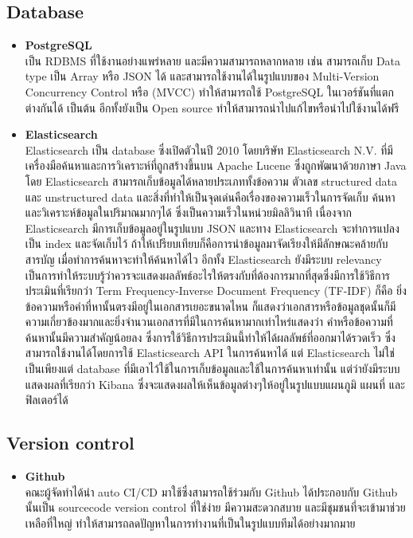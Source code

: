 \documentclass[12pt,oneside,openright,a4paper]{cpe-thai-project}
\begin{document}
\subsection{Database}
\begin{itemize}
  \item \textbf{PostgreSQL} \\
\hspace*{1cm} เป็น RDBMS ที่ใช้งานอย่างแพร่หลาย และมีความสามารถหลากหลาย เช่น สามารถเก็บ Data type เป็น Array หรือ JSON ได้ และสามารถใช้งานได้ในรูปแบบของ Multi-Version Concurrency Control หรือ (MVCC) ทำให้สามารถใช้ PostgreSQL ในเวอร์ชันที่แตกต่างกันได้ เป็นต้น อีกทั้งยังเป็น Open source ทำให้สามารถนำไปแก้ไขหรือนำไปใช้งานได้ฟรี
  \item \textbf{Elasticsearch} \\
\hspace*{1cm} Elasticsearch \cite{WhatIsElasticsearch, ElasticsearchForSearchEngine} เป็น database ซึ่งเปิดตัวในปี 2010 โดยบริษัท Elasticsearch N.V. ที่มีเครื่องมือค้นหาและการวิเคราะห์ที่ถูกสร้างขึ้นบน Apache Lucene ซึ่งถูกพัฒนาด้วยภาษา Java โดย Elasticsearch สามารถเก็บข้อมูลได้หลายประเภททั้งข้อความ ตัวเลข structured data และ unstructured data และสิ่งที่ทำให้เป็นจุดเด่นคือเรื่องของความเร็วในการจัดเก็บ ค้นหา และวิเคราะห์ข้อมูลในปริมาณมากๆได้ ซึ่งเป็นความเร็วในหน่วยมิลลิวินาที เนื่องจาก Elasticsearch มีการเก็บข้อมูลอยู่ในรูปแบบ JSON และทาง Elasticsearch จะทำการแปลงเป็น index และจัดเก็บไว้ ถ้าให้เปรียบเทียบก็คือการนำข้อมูลมาจัดเรียงให้มีลักษณะคล้ายกับสารบัญ เมื่อทำการค้นหาจะทำให้ค้นหาได้ไว อีกทั้ง Elasticsearch ยังมีระบบ relevancy เป็นการทำให้ระบบรู้ว่าควรจะแสดงผลลัพธ์อะไรให้ตรงกับที่ต้องการมากที่สุดซึ่งมีการใช้วิธีการประเมินที่เรียกว่า Term Frequency-Inverse Document Frequency (TF-IDF) ก็คือ ยิ่งข้อความหรือคำที่หานั้นตรงมีอยู่ในเอกสารเยอะขนาดไหน ก็แสดงว่าเอกสารหรือข้อมูลชุดนั้นก็มีความเกี่ยวข้องมากและยิ่งจำนวนเอกสารที่มีในการค้นหามากเท่าไหร่แสดงว่า คำหรือข้อความที่ค้นหานั้นมีความสำคัญน้อยลง ซึ่งการใช้วิธีการประเมินนี้ทำให้ได้ผลลัพธ์ที่ออกมาได้รวดเร็ว ซึ่งสามารถใช้งานได้โดยการใช้ Elasticsearch API ในการค้นหาได้ แต่ Elasticsearch ไม่ใช่เป็นเพียงแต่ database ที่มีเอาไว้ใช้ในการเก็บข้อมูลและใช้ในการค้นหาเท่านั้น แต่ว่ายังมีระบบแสดงผลที่เรียกว่า Kibana ซึ่งจะแสดงผลให้เห็นข้อมูลต่างๆให้อยู่ในรูปแบบแผนภูมิ แผนที่ และฟิลเตอร์ได้
\end{itemize}
\subsection{Version control}
\begin{itemize}
  \item \textbf{Github} \\
\hspace*{1cm} คณะผู้จัดทำได้นำ auto CI/CD มาใช้ซึ่งสามารถใช้ร่วมกับ Github ได้ประกอบกับ Github นั้นเป็น sourcecode version control ที่ใช่ง่าย มีความสะดวกสบาย และมีชุมชนที่จะเข้ามาช่วยเหลือที่ใหญ่ ทำให้สามารถลดปัญหาในการทำงานที่เป็นในรูปแบบทีมได้อย่างมากมาย
\end{itemize}
\end{document}
